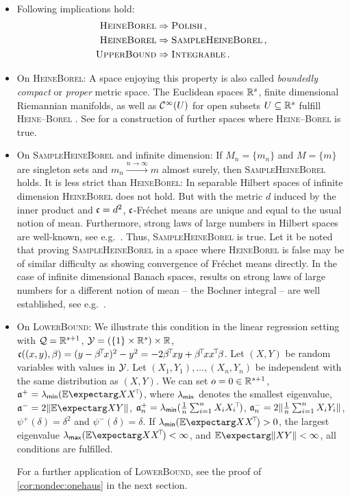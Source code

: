 \begin{remark}\label{rem:on_ass1}\mbox{ }
\begin{itemize}
\item 
	Following implications hold:
	\begin{align*}
	\textsc{HeineBorel} &\Rightarrow \textsc{Polish}\, ,\\
	\textsc{HeineBorel} &\Rightarrow \textsc{SampleHeineBorel}\, ,\\
	\textsc{UpperBound} &\Rightarrow \textsc{Integrable}\, .
	\end{align*}
\item On \textsc{HeineBorel}:
	A space enjoying this property is also called \textit{boundedly compact} or \textit{proper} metric space.
	The Euclidean spaces $\mathbb{R}^s$, finite dimensional Riemannian manifolds, as well as $\mathcal{C}^\infty(U)$ for open subsets $U \subseteq \mathbb{R}^s$  fulfill \textsc{Heine--Borel} \cite[section 8.4.7]{edwards95}.
	See \cite{williamson87} for a construction of further spaces where \textsc{Heine--Borel} is true. 
\item On \textsc{SampleHeineBorel} and infinite dimension:
	If $M_n=\{m_n\}$ and $M=\{m\}$ are singleton sets and $m_n \xrightarrow{n\to\infty} m$ almost surely, then \textsc{SampleHeineBorel} holds. It is less strict than \textsc{HeineBorel}: In separable Hilbert spaces of infinite dimension \textsc{HeineBorel} does not hold. But with the metric $d$ induced by the inner product and $\mathfrak{c}=d^2$, $\mathfrak{c}$-Fréchet means are unique and equal to the usual notion of mean. Furthermore, strong laws of large numbers in Hilbert spaces are well-known, see e.g.\ \cite{kawabe86}. Thus, \textsc{SampleHeineBorel} is true. Let it be noted that proving \textsc{SampleHeineBorel} in a space where \textsc{HeineBorel} is false may be of similar difficulty as showing convergence of Fréchet means directly. In the case of infinite dimensional Banach spaces, results on strong laws of large numbers for a different notion of mean -- the Bochner integral -- are well established, see e.g.\ \cite{hoffmann76}.
\item On \textsc{LowerBound}:
	We illustrate this condition in the linear regression setting with $\mathcal{Q} = \mathbb{R}^{s+1}$, $\mathcal{Y} = (\{1\}\times\mathbb{R}^s) \times \mathbb{R}$, $\mf c((x,y),\beta) = (y - \beta\tr x)^2 - y^2 = - 2 \beta\tr x y + \beta\tr xx\tr \beta$. Let $(X, Y)$ be random variables with values in $\mathcal{Y}$. Let $(X_1, Y_1),\dots, (X_n, Y_n)$ be independent with the same distribution as $(X,Y)$. We can set $o = 0\in\mathbb{R}^{s+1}$, $\mf a^+ = \lambda_{\ms{min}}(\Ex{XX\tr})$, where $\lambda_{\mathsf{min}}$ denotes the smallest eigenvalue, $\mf a^- = 2 \normof{\Ex{XY}}$, $\mathfrak{a}^+_n = \lambda_{\mathsf{min}}(\frac1n \sum_{i=1}^n X_iX_i\!^\top\!)$, $\mathfrak{a}^-_n = 2 \Vert \frac1n\sum_{i=1}^n X_iY_i \Vert$, $\psi^+(\delta) = \delta^2$ and $\psi^-(\delta) = \delta$. If $\lambda_{\ms{min}}(\Ex{XX\tr}) > 0$, the largest eigenvalue $\lambda_{\ms{max}}(\Ex{XX\tr}) < \infty$, and $\Ex{\normof{XY}} < \infty$, all conditions are fulfilled.
	
	For a further application of \textsc{LowerBound}, see the proof of \autoref{cor:nondec:onehaus} in the next section.
\end{itemize}
\end{remark}
